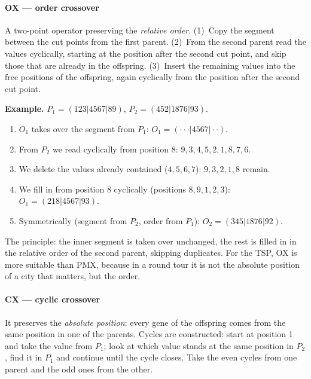 \documentclass[11pt,a4paper]{article}
\theoremstyle{definition}
\begin{document}
\paragraph{OX --- order crossover}

\begin{defbox}
A two-point operator preserving the \emph{relative order}. (1)~Copy the segment
between the cut points from the first parent. (2)~From the second parent read
the values cyclically, starting at the position after the second cut point, and
skip those that are already in the offspring. (3)~Insert the remaining values
into the free positions of the offspring, again cyclically from the position
after the second cut point.
\end{defbox}

\textbf{Example.} $P_1 = (123|4567|89)$, $P_2 = (452|1876|93)$.
\begin{enumerate}
\item $O_1$ takes over the segment from $P_1$:
  $O_1 = ({\cdot}{\cdot}{\cdot}|4567|{\cdot}{\cdot})$.
\item From $P_2$ we read cyclically from position 8: $9,3,4,5,2,1,8,7,6$.
\item We delete the values already contained ($4,5,6,7$): $9,3,2,1,8$ remain.
\item We fill in from position 8 cyclically (positions $8,9,1,2,3$):
  $O_1 = (218|4567|93)$.
\item Symmetrically (segment from $P_2$, order from $P_1$):
  $O_2 = (345|1876|92)$.
\end{enumerate}
The principle: the inner segment is taken over unchanged, the rest is filled in
in the relative order of the second parent, skipping duplicates. For the TSP, OX
is more suitable than PMX, because in a round tour it is not the absolute
position of a city that matters, but the order.

\paragraph{CX --- cyclic crossover}

\begin{defbox}
It preserves the \emph{absolute position}: every gene of the offspring comes
from the same position in one of the parents. Cycles are constructed: start at
position 1 and take the value from $P_1$; look at which value stands at the same
position in $P_2$, find it in $P_1$ and continue until the cycle closes. Take
the even cycles from one parent and the odd ones from the other.
\end{defbox}
\end{document}
